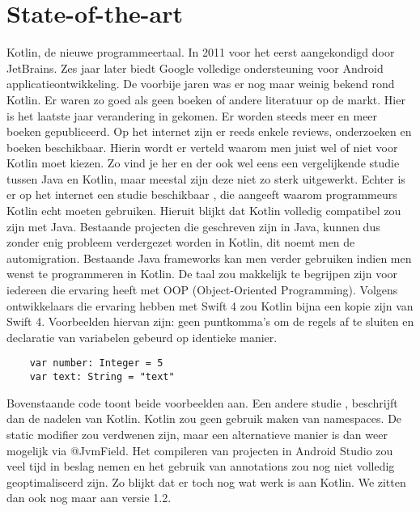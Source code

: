 	\section{State-of-the-art}
	\label{sec:state-of-the-art}
	Kotlin, de nieuwe programmeertaal. In 2011 voor het eerst aangekondigd door JetBrains. Zes jaar later biedt Google volledige ondersteuning voor Android applicatieontwikkeling. De voorbije jaren was er nog maar weinig bekend rond Kotlin. Er waren zo goed als geen boeken of andere literatuur op de markt. Hier is het laatste jaar verandering in gekomen. Er worden steeds meer en meer boeken gepubliceerd. 
	\newline
	\newline
	Op het internet zijn er reeds enkele reviews, onderzoeken en boeken beschikbaar. Hierin wordt er verteld waarom men juist wel of niet voor Kotlin moet kiezen. Zo vind je her en der ook wel eens een vergelijkende studie tussen Java en Kotlin, maar meestal zijn deze niet zo sterk uitgewerkt.
	\newline
	\newline
	Echter is er op het internet een studie beschikbaar \autocite{Pros}, die aangeeft waarom programmeurs Kotlin echt moeten gebruiken. Hieruit blijkt dat Kotlin volledig compatibel zou zijn met Java. Bestaande projecten die geschreven zijn in Java, kunnen dus zonder enig probleem verdergezet worden in Kotlin, dit noemt men de automigration. Bestaande Java frameworks kan men verder gebruiken indien men wenst te programmeren in Kotlin. De taal zou makkelijk te begrijpen zijn voor iedereen die ervaring heeft met OOP (Object-Oriented Programming). Volgens ontwikkelaars die ervaring hebben met Swift 4 zou Kotlin bijna een kopie zijn van Swift 4. Voorbeelden hiervan zijn: geen puntkomma's om de regels af te sluiten en declaratie van variabelen gebeurd op identieke manier.
	\begin{lstlisting}
	var number: Integer = 5
	var text: String = "text"
	\end{lstlisting}
	Bovenstaande code toont beide voorbeelden aan.
	\newline
	\newline
	Een andere studie \autocite{Cons}, beschrijft dan de nadelen van Kotlin. Kotlin zou geen gebruik maken van namespaces. De static modifier zou verdwenen zijn, maar een alternatieve manier is dan weer mogelijk via @JvmField. Het compileren van projecten in Android Studio zou veel tijd in beslag nemen en het gebruik van annotations zou nog niet volledig geoptimaliseerd zijn. Zo blijkt dat er toch nog wat werk is aan Kotlin. We zitten dan ook nog maar aan versie 1.2. 

